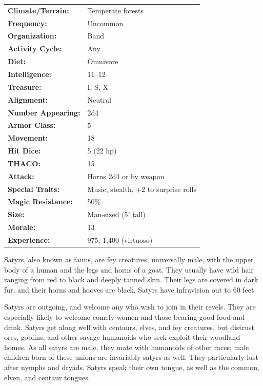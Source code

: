 \begin{multicols}{2}
\begin{minipage}{\columnwidth}
\noindent \begin{tabular}{p{}p{}}
\textbf{Climate/Terrain:}	& Temperate forests	\\
\textbf{Frequency:} 		& Uncommon	\\
\textbf{Organization:} 		& Band	\\
\textbf{Activity Cycle:} 	& Any	\\
\textbf{Diet:} 				& Omnivore	\\
\textbf{Intelligence:} 		& 11--12	\\
\textbf{Treasure:} 			& I, S, X	\\
\textbf{Alignment:} 		& Neutral	\\
\hline
\textbf{Number Appearing:} 	& 2d4	\\
\textbf{Armor Class:} 		& 5	\\
\textbf{Movement:} 			& 18	\\
\textbf{Hit Dice:} 			& 5 (22 hp)	\\
\textbf{THACO:} 			& 15	\\
\textbf{Attack:} 			& Horns 2d4 or by weapon	\\
\textbf{Special Traits:} & Music, stealth, +2 to surprise rolls	\\
\textbf{Magic Resistance:} 	& 50\%	\\
\textbf{Size:} 				& Man-sized (5' tall)	\\
\textbf{Morale:} 			& 13	\\
\textbf{Experience:} 		& 975; 1,400 (virtuoso)	\\
\end{tabular}

\end{minipage}

Satyrs, also known as fauns, are fey creatures, universally male, with the upper body of a human and the legs and horns of a goat. They usually have wild hair ranging from red to black and deeply tanned skin. Their legs are covered in dark fur, and their horns and hooves are black. Satyrs have infravision out to 60 feet.

Satyrs are outgoing, and welcome any who wish to join in their revels. They are especially likely to welcome comely women and those bearing good food and drink. Satyrs get along well with centaurs, elves, and fey creatures, but distrust orcs, goblins, and other savage humanoids who seek exploit their woodland homes. As all satyrs are male, they mate with humanoids of other races; male children born of these unions are invariably satyrs as well. They particularly lust after nymphs and dryads. Satyrs speak their own tongue, as well as the common, elven, and centaur tongues. 


\end{multicols}
